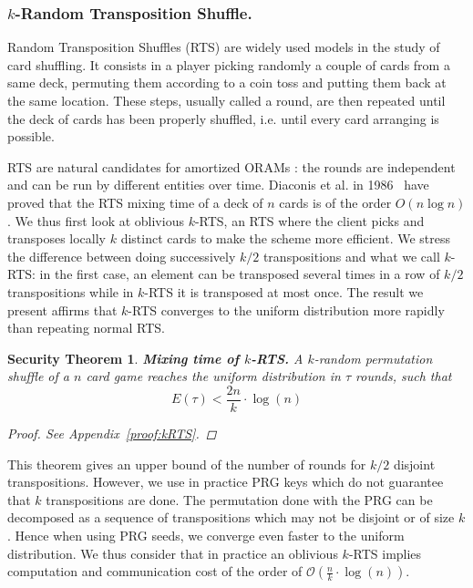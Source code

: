 \documentclass[USenglish,oneside,twocolumn]{article}
\newtheorem{secthm}{Security Theorem}
\begin{document}
%
\subsubsection{$k$-Random Transposition Shuffle.}\label{kRTS}
Random Transposition Shuffles (RTS) are widely used models in the study of card shuffling. It consists in a player picking randomly a couple of cards from a same deck, permuting them according to a coin toss and putting them back at the same location.
These steps, usually called a round, are then repeated until the deck of cards has been properly shuffled, i.e. until every card arranging is possible.

RTS are natural candidates for amortized ORAMs : the rounds are independent and can be run by different entities over time. 
Diaconis et al. in 1986~\cite{aldous1986shuffling} have proved that the RTS mixing time of a deck of $n$ cards is of the order  $O\left(n\log n \right)$. We thus first look at oblivious $k$-RTS, an RTS where the client picks and transposes locally $k$ distinct cards to make the scheme more efficient. We stress the difference between doing successively $k/2$ transpositions and what we call $k$-RTS: in the first case, an element can be transposed several times in a row of $k/2$ transpositions while in $k$-RTS it is transposed at most once. The result we present affirms that  $k$-RTS converges to the uniform distribution more rapidly than repeating normal RTS.  

\begin{secthm}
\textbf{Mixing time of $k$-RTS.} A $k$-random permutation shuffle of a $n$ card game reaches the uniform distribution in $\tau$ rounds, such that
$$E(\tau) < \frac{2 n}{k}\cdot \log(n)$$
\begin{proof}
See Appendix~\ref{proof:kRTS}.
\end{proof}
\end{secthm}

This theorem gives an upper bound of the number of rounds for $k/2$ disjoint transpositions. However, we use in practice PRG keys which do not guarantee that $k$ transpositions are done. The permutation done with the PRG can be decomposed as a sequence of transpositions which may not be disjoint or of size $k$. Hence when using PRG seeds, we converge even faster to the uniform distribution. We thus consider that in practice an oblivious $k$-RTS implies computation and communication cost of the order of $\mathcal{O} \left(\frac{n}{k}\cdot \log(n)\right)$.\\
\end{document}
